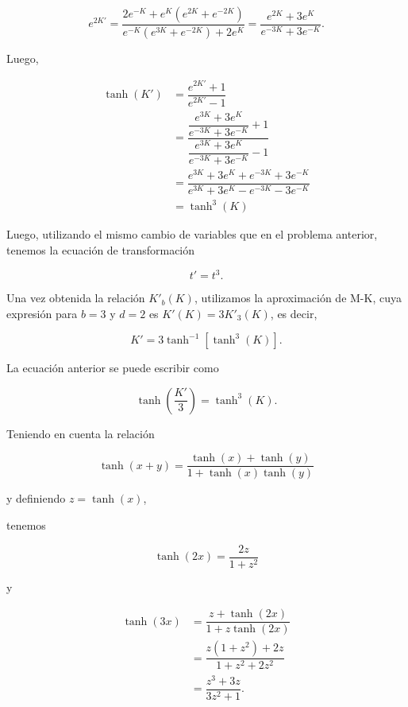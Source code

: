 \documentclass[10pt]{article}
\begin{document}
\begin{equation}
e^{2K'} = \dfrac{2e^{-K} + e^K(e^{2K} + e^{-2K})}{e^{-K}(e^{3K} + e^{-2K}) + 2e^K} = \dfrac{e^{2K} + 3e^{K}}{e^{-3K}+3e^{-K}}.
\end{equation}

Luego,

\begin{align*}
\tanh(K') &= \dfrac{e^{2K'}+1}{e^{2K'}-1} \\
&= \dfrac{\dfrac{e^{3K} + 3e^{K}}{e^{-3K}+3e^{-K}} + 1}{\dfrac{e^{3K} + 3e^{K}}{e^{-3K}+3e^{-K}} - 1} \\
&= \dfrac{e^{3K} + 3e^{K} + e^{-3K}+3e^{-K}}{e^{3K} + 3e^{K}-e^{-3K}-3e^{-K}} \\
&= \tanh^3(K)
\end{align*}

Luego, utilizando el mismo cambio de variables que en el problema anterior, tenemos la ecuaci\'on de transformaci\'on 

\begin{equation}
t' = t^3.
\end{equation}

Una vez obtenida la relaci\'on $K'_b(K)$, utilizamos la aproximaci\'on de M-K, cuya expresi\'on para $b = 3$ y $d = 2$ es $K'(K) = 3 K'_3(K)$, es decir,

\begin{equation}
K' = 3 \tanh^{-1}\left[\tanh^3(K)\right].
\end{equation}

La ecuaci\'on anterior se puede escribir como 

\begin{equation}
\tanh\left( \dfrac{K'}{3} \right) = \tanh^3(K).
\end{equation}

Teniendo en cuenta la relaci\'on 

\begin{equation}
\tanh(x+y) = \dfrac{\tanh(x) + \tanh(y)}{1 + \tanh(x) \tanh(y)}
\end{equation}

y definiendo $z = \tanh(x)$,

tenemos

\begin{equation}
\tanh(2x) = \dfrac{2 z}{1+z^2}
\end{equation}

y

\begin{align}
\tanh(3x) &= \dfrac{z + \tanh(2x)}{1 + z \tanh(2x)} \\
&= \dfrac{z (1 + z^2) + 2z}{1 + z^2 + 2z^2} \\
&= \dfrac{z^3 + 3 z}{3 z^2 + 1}.
\end{align}
\end{document}
